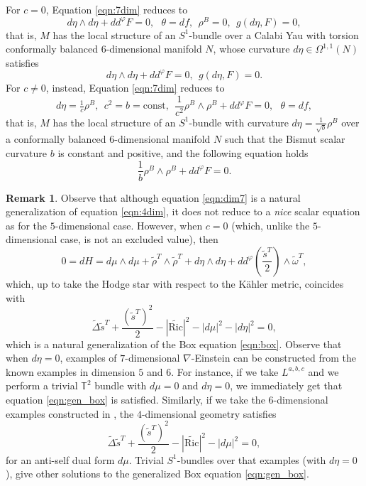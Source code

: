 \documentclass{article}
\makeatletter
\renewenvironment{proof}[1][\proofname]{%
  \par\pushQED{\qed}%
  \normalfont\topsep6\p@\@plus6\p@\relax
  \trivlist
  \item[\hskip\labelsep
        \textbf{\textup{#1}}\@addpunct{.}]\ignorespaces
}{%
  \popQED\endtrivlist\@endpefalse
}
\theoremstyle{definition}
\newtheorem{rmk}[thm]{Remark}
\renewcommand{\phi}{\varphi}
\numberwithin{equation}{section}
\makeatother
\begin{document}
\begin{proof}
For $c=0$, Equation \eqref{eqn:7dim} reduces to 
\[
d\eta \wedge d\eta + dd^\phi F=0, \ \ \ \theta=df, \ \ \rho^B=0, \ \ g(d\eta,F)=0,
\]
that is, $M$ has the local structure of an $S^1$-bundle over a Calabi Yau with torsion conformally balanced $6$-dimensional manifold $N$, whose curvature $d\eta \in \Omega^{1,1}(N)$ satisfies
\[
d\eta \wedge d\eta + dd^\phi F=0, \ \ g(d\eta,F)=0.
\]
For $c \neq 0$, instead, Equation \eqref{eqn:7dim} reduces to 
\[
d\eta=\tfrac{1}{c}\rho^B, \ \ c^2=b=\text{const}, \ \  \frac{1}{c^2} \rho^B \wedge \rho^B + dd^\phi F=0, \ \ \ \theta=df, 
\]
that is, $M$ has the local structure of an $S^1$-bundle with curvature $d\eta=\tfrac{1}{\sqrt b}\rho^B$ over a conformally balanced $6$-dimensional manifold $N$ such that the Bismut scalar curvature $b$ is constant and positive, and the following equation holds
\[
 \frac{1}{b}  \rho^B \wedge \rho^B + dd^\phi F=0.
\]
\end{proof}



\begin{rmk}
 Observe that although equation \eqref{eqn:dim7} is a natural generalization of equation \eqref{eqn:4dim}, it does not reduce to a \emph{nice} scalar equation as for the $5$-dimensional case. However, when $c=0$ (which, unlike the $5$-dimensional case, is not an excluded value), then 
\[
0=dH=d\mu \wedge d\mu+ \tilde \rho^T \wedge \tilde \rho^T +d\eta \wedge d\eta+dd^\phi \left(\frac{\tilde s^T}{2}\right)\wedge \tilde \omega^T,
\]
which, up to take the Hodge star with respect to the K\"ahler metric, coincides with 
\begin{equation} \label{eqn:gen_box}
  \tilde \Delta \tilde s^T +\frac{(\tilde s^T)^2}{2}-|\tilde {\mathrm{Ric}}|^2-|d \mu |^2-|d\eta|^2=0,  
\end{equation}
which is a natural generalization of the Box equation \eqref{eqn:box}. Observe that when $d\eta=0$, examples of $7$-dimensional $\nabla$-Einstein can be constructed from the known examples in dimension $5$ and $6$. For instance, if we take $L^{a,b,c}$ and we perform a trivial $\mathbb{T}^2$ bundle with $d\mu=0$ and $d\eta=0$, we immediately get that equation \eqref{eqn:gen_box} is satisfied. Similarly, if we take the $6$-dimensional examples constructed in \cite{ALL}, the $4$-dimensional geometry satisfies 
\begin{equation} 
  \tilde \Delta \tilde s^T +\frac{(\tilde s^T)^2}{2}-|\tilde {\mathrm{Ric}}|^2-|d \mu |^2=0,  
\end{equation}
for an anti-self dual form $d\mu$. Trivial $S^1$-bundles over that examples (with $d\eta=0$), give other solutions to the generalized Box equation \eqref{eqn:gen_box}.

\end{rmk}
\end{document}
